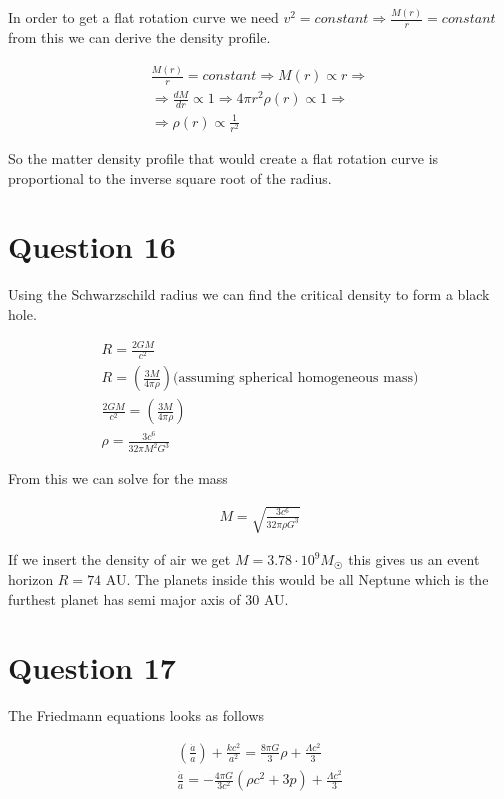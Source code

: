 \documentclass[a4paper]{article}
\begin{document}
In order to get a flat rotation curve we need $v^2 = constant \Rightarrow \frac{M(r)}{r} = constant$ from this we can derive the density profile.

\begin{align}
    \frac{M(r)}{r} = constant \Rightarrow M(r) \propto r  \Rightarrow \\
    \Rightarrow \frac{dM}{dr} \propto 1 \Rightarrow 4\pi r^2 \rho(r) \propto 1 \Rightarrow \\
    \Rightarrow \rho(r) \propto \frac{1}{r^2}
\end{align}

So the matter density profile that would create a flat rotation curve is proportional to the inverse square root of the radius. 

\section*{Question 16}

Using the Schwarzschild radius we can find the critical density to form a black hole.

\begin{align}
    R = \frac{2GM}{c^2} \\
    R = \left ( \frac{3M}{4\pi \rho }\right ) \text{(assuming spherical homogeneous mass)} \\
    \frac{2GM}{c^2} = \left ( \frac{3M}{4\pi \rho }\right ) \\
    \rho = \frac{3c^6}{32 \pi M^2 G^3}
\end{align}

From this we can solve for the mass 

\begin{align}
    M = \sqrt{\frac{3c^6}{32 \pi \rho G^3}}
\end{align}

If we insert the density of air we get $M = 3.78 \cdot 10^9 M_{\Sun}$ this gives us an event horizon $R = 74$ AU. The planets inside this would be all Neptune which is the furthest planet has semi major axis of 30 AU. 

\section*{Question 17}

The Friedmann equations looks as follows

\begin{align}
    \left ( \frac{\dot{a}}{a}\right ) + \frac{kc^2}{a^2} = \frac{8 \pi G}{3} \rho + \frac{\Lambda c^2}{3} \\
    \frac{\ddot{a}}{a} = -\frac{4\pi G}{3c^2}(\rho c^2 + 3p) + \frac{\Lambda c^2}{3}
\end{align}
\end{document}
